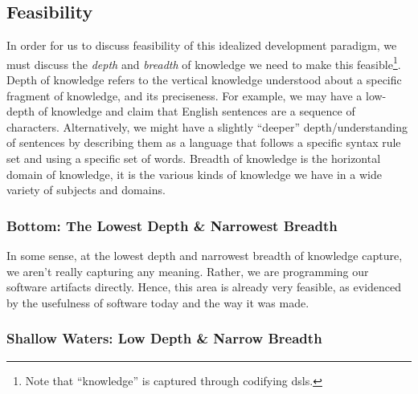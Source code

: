 \subsection{Feasibility}
\label{chap:ideology:sec:thoughts_of_generation:subsec:feasibility}

In order for us to discuss feasibility of this idealized development paradigm,
we must discuss the \textit{depth} and \textit{breadth} of knowledge we need to
make this feasible\footnote{Note that ``knowledge'' is captured through
codifying \acsp{dsl}.}. Depth of knowledge refers to the vertical knowledge
understood about a specific fragment of knowledge, and its preciseness. For
example, we may have a low-depth of knowledge and claim that English sentences
are a sequence of characters. Alternatively, we might have a slightly ``deeper''
depth/understanding  of sentences by describing them as a language that follows
a specific syntax rule set and using a specific set of words. Breadth of
knowledge is the horizontal domain of knowledge, it is the various kinds of
knowledge we have in a wide variety of subjects and domains.

\subsubsection{Bottom: The Lowest Depth \& Narrowest Breadth}
\label{chap:ideology:sec:thoughts_of_generation:subsec:feasibility:subsubsec:bottom}

In some sense, at the lowest depth and narrowest breadth of knowledge capture,
we aren't really capturing any meaning. Rather, we are programming our software
artifacts directly. Hence, this area is already very feasible, as evidenced by
the usefulness of software today and the way it was made.

\subsubsection{Shallow Waters: Low Depth \& Narrow Breadth}
\label{chap:ideology:sec:thoughts_of_generation:subsec:feasibility:subsubsec:low}

